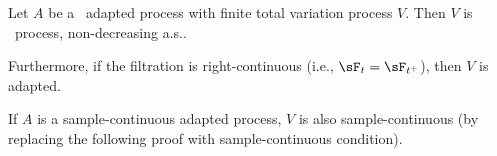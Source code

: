 \begin{lemma}\label{lem:cadlag_sample_continuous_process_finite_variation_process}
Let $A$ be a \cadlag\ adapted process with finite total variation process $V$. Then $V$ is \cadlag\ process, non-decreasing a.s..%

Furthermore, if the filtration is right-continuous (i.e., $\sF_t = \sF_{t^+}$), then $V$ is adapted.%
\end{lemma}

\begin{remark}
If $A$ is a sample-continuous adapted process, $V$ is also sample-continuous (by replacing the following proof with sample-continuous condition).
\end{remark}


